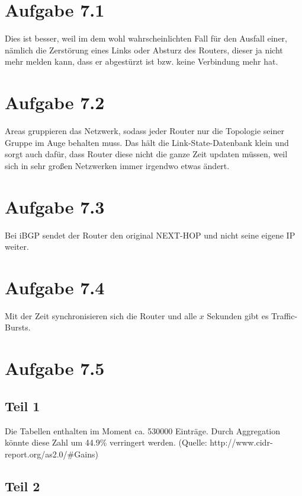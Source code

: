\documentclass[10pt,a4paper]{article}
\begin{document}
\section{Aufgabe 7.1}

Dies ist besser, weil im dem wohl wahrscheinlichten Fall für den Ausfall einer,
nämlich die Zerstörung eines Links oder Absturz des Routers, dieser ja nicht
mehr melden kann, dass er abgestürzt ist bzw. keine Verbindung mehr hat.

\section{Aufgabe 7.2}

Areas gruppieren das Netzwerk, sodass jeder Router nur die Topologie seiner
Gruppe im Auge behalten muss. Das hält die Link-State-Datenbank klein und sorgt
auch dafür, dass Router diese nicht die ganze Zeit updaten müssen, weil sich in
sehr großen Netzwerken immer irgendwo etwas ändert.

\section{Aufgabe 7.3}

Bei iBGP sendet der Router den original NEXT-HOP und nicht seine eigene IP
weiter.

\section{Aufgabe 7.4}

Mit der Zeit synchronisieren sich die Router und alle $x$ Sekunden gibt es
Traffic-Bursts.

\section{Aufgabe 7.5}

\subsection{Teil 1}

Die Tabellen enthalten im Moment ca. 530000 Einträge. Durch Aggregation könnte
diese Zahl um 44.9\% verringert werden. (Quelle:
http://www.cidr-report.org/as2.0/\#Gains)

\subsection{Teil 2}
\end{document}
